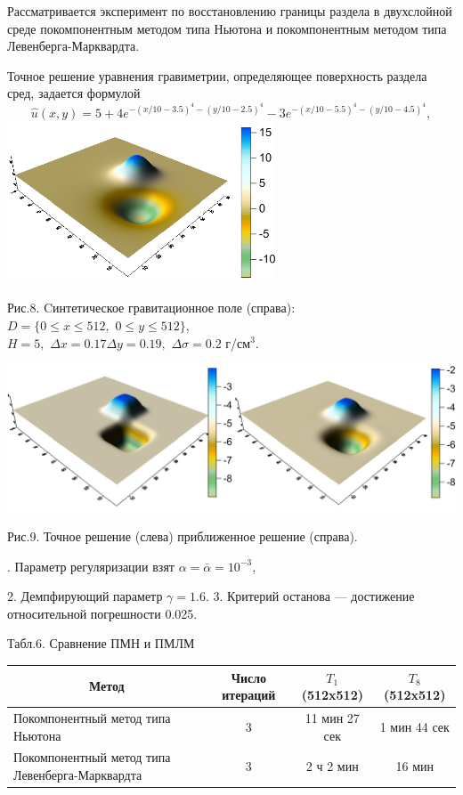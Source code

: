 \documentclass[10pt,pdf, mathserif, hyperref={unicode}]{beamer}
\begin{document}
\begin{frame}
	Рассматривается эксперимент по восстановлению границы раздела в двухслойной среде покомпонентным методом типа Ньютона и покомпонентным методом типа Левенберга-Марквардта.
	
	Точное решение уравнения гравиметрии, определяющее поверхность раздела сред, задается формулой
	$$\hat{u}(x,y)=5+4e^{-(x/10-3.5)^4-(y/10-2.5)^4}-3e^{-(x/10-5.5)^4-(y/10-4.5)^4},$$
	\centering
	\includegraphics[width=0.6\textwidth, height=0.35\textheight]{gravyf_nov2014.png}
		
	Рис.8. Cинтетическое гравитационное поле (справа): $D=\{0\le x\le 512, \,\,0\le y\le 512\}$, \\ $  H=5,\,\,\Delta x=0.17 \Delta y=0.19,\,\,\Delta\sigma=0.2$ г/см$^3$.
\end{frame}
\begin{frame}
	\includegraphics[width=\textwidth, height=0.35\textheight]{gravy_nov2014.png}
	
	\centering
	Рис.9. Точное решение (слева) приближенное решение (справа).
	
	. Параметр регуляризации взят $\alpha=\bar{\alpha}=10^{-3}$,
	
	2. Демпфирующий параметр $\gamma=1.6$.
	3. Критерий останова --- достижение относительной погрешности 0.025.
	\begin{table}[]
		\centering
		{\scriptsize Табл.6. Сравнение ПМН и ПМЛМ}
		\begin{tabular}{|p{}|c|c|c|}
			\hline
			\multicolumn{1}{|c|}{\textbf{Метод}}            & \textbf{Число итераций} & \textbf{$T_1$ (512x512)} & \textbf{$T_8$ (512x512)} \\ \hline
			Покомпонентный метод типа Ньютона               & 3                       & 11 мин 27 сек   & 1 мин 44 сек    \\ \hline
			Покомпонентный метод типа Левенберга-Марквардта & 3                       & 2 ч 2 мин       & 16 мин          \\ \hline
		\end{tabular}
	\end{table}
\end{frame}
\end{document}
